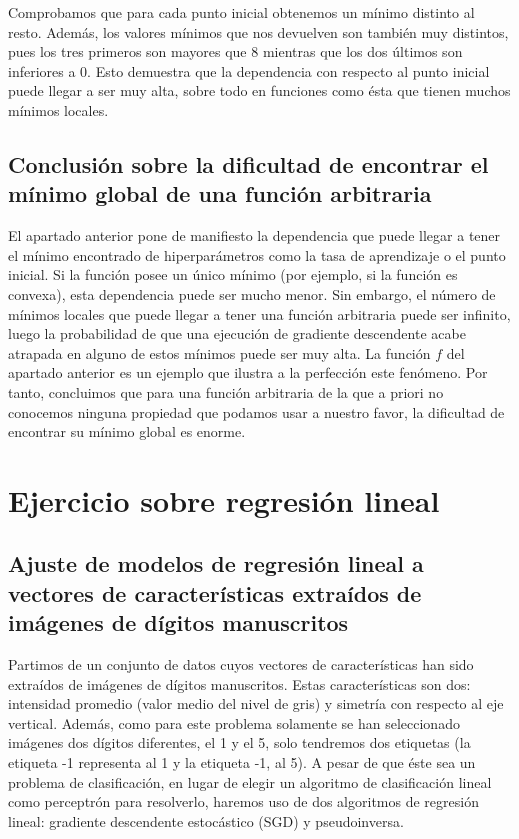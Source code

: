 \documentclass[10pt,a4paper]{article}
\begin{document}
Comprobamos que para cada punto inicial obtenemos un mínimo distinto al resto. Además, los valores mínimos que nos devuelven son también muy distintos, pues los tres primeros son mayores que 8 mientras que los dos últimos son inferiores a 0. Esto demuestra que la dependencia con respecto al punto inicial puede llegar a ser muy alta, sobre todo en funciones como ésta que tienen muchos mínimos locales.



\subsection{Conclusión sobre la dificultad de encontrar el mínimo global de una función arbitraria}

El apartado anterior pone de manifiesto la dependencia que puede llegar a tener el mínimo encontrado de hiperparámetros como la tasa de aprendizaje o el punto inicial. Si la función posee un único mínimo (por  ejemplo, si la función es convexa), esta dependencia puede ser mucho menor. Sin embargo, el número de mínimos locales que puede llegar a tener una función arbitraria puede ser infinito, luego la probabilidad de que una ejecución de gradiente descendente acabe atrapada en alguno de estos mínimos puede ser muy alta. La función $f$ del apartado anterior es un ejemplo que ilustra a la perfección este fenómeno. Por tanto, concluimos que para una función arbitraria de la que a priori no conocemos ninguna propiedad que podamos usar a nuestro favor, la dificultad de encontrar su mínimo global es enorme.







\newpage

\section{Ejercicio sobre regresión lineal}

\subsection{Ajuste de modelos de regresión lineal a vectores de características extraídos de imágenes de dígitos manuscritos}

Partimos de un conjunto de datos cuyos vectores de características han sido extraídos de imágenes de dígitos manuscritos. Estas características son dos: intensidad promedio (valor medio del nivel de gris) y simetría con respecto al eje vertical. Además, como para este problema solamente se han seleccionado imágenes dos dígitos diferentes, el 1 y el 5, solo tendremos dos etiquetas (la etiqueta -1 representa al 1 y la etiqueta -1, al 5). A pesar de que éste sea un problema de clasificación, en lugar de elegir un algoritmo de clasificación lineal como perceptrón para resolverlo, haremos uso de dos algoritmos de regresión lineal: gradiente descendente estocástico (SGD) y pseudoinversa.
\end{document}
